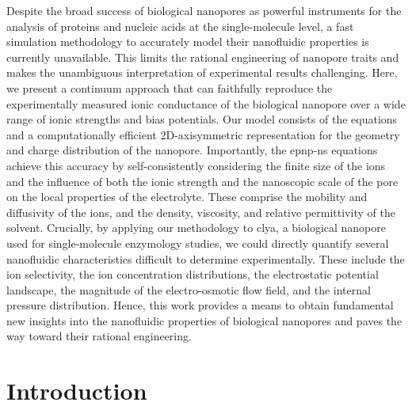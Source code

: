 Despite the broad success of biological nanopores as powerful instruments for the analysis of proteins and
nucleic acids at the single-molecule level, a fast simulation methodology to accurately model their
nanofluidic properties is currently unavailable. This limits the rational engineering of nanopore traits and
makes the unambiguous interpretation of experimental results challenging. Here, we present a continuum
approach that can faithfully reproduce the experimentally measured ionic conductance of the biological
nanopore  over a wide range of ionic strengths and bias potentials. Our model consists of the
 equations and a computationally efficient 2D-axisymmetric representation for the geometry
and charge distribution of the nanopore. Importantly, the \gls{epnp-ns} equations achieve this accuracy by
self-consistently considering the finite size of the ions and the influence of both the ionic strength and the
nanoscopic scale of the pore on the local properties of the electrolyte. These comprise the mobility and
diffusivity of the ions, and the density, viscosity, and relative permittivity of the solvent. Crucially, by
applying our methodology to \gls{clya}, a biological nanopore used for single-molecule enzymology studies, we
could directly quantify several nanofluidic characteristics difficult to determine experimentally. These
include the ion selectivity, the ion concentration distributions, the electrostatic potential landscape, the
magnitude of the electro-osmotic flow field, and the internal pressure distribution. Hence, this work provides
a means to obtain fundamental new insights into the nanofluidic properties of biological nanopores and paves
the way toward their rational engineering.


\section{Introduction}
%
\label{sec:epnp-ns:intro}
%

